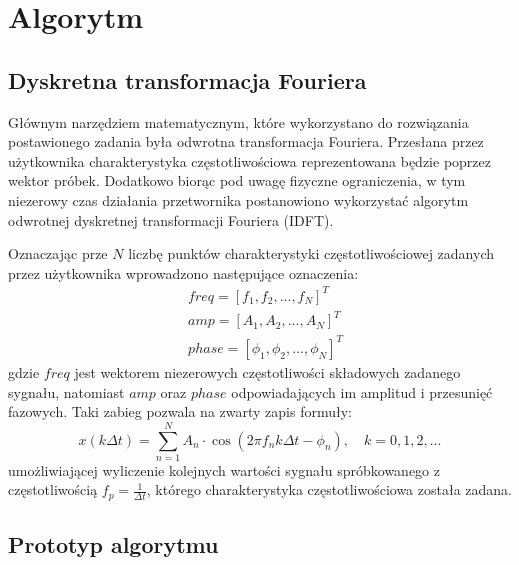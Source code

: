\section{Algorytm}
\subsection{Dyskretna transformacja Fouriera}
Głównym narzędziem matematycznym, które wykorzystano do rozwiązania postawionego zadania była odwrotna transformacja Fouriera. Przesłana przez użytkownika charakterystyka częstotliwościowa reprezentowana będzie poprzez wektor próbek. Dodatkowo biorąc pod uwagę fizyczne ograniczenia, w tym niezerowy czas działania przetwornika postanowiono wykorzystać algorytm odwrotnej dyskretnej transformacji Fouriera (IDFT). 

Oznaczając prze $N$ liczbę punktów charakterystyki częstotliwościowej zadanych przez użytkownika wprowadzono następujące oznaczenia:
\begin{align*} 
&freq = [f_1, f_2, ..., f_N]^T \\ 
&amp = [A_1, A_2, ..., A_N]^T \\
&phase = [\phi_1, \phi_2, ..., \phi_N]^T
\end{align*}
gdzie $freq$ jest wektorem niezerowych częstotliwości składowych zadanego sygnału, natomiast $amp$ oraz $phase$ odpowiadających im amplitud i przesunięć fazowych. Taki zabieg pozwala na zwarty zapis formuły:
\begin{equation}
x(k\Delta t) = \sum_{n=1}^{N}A_n\cdot\cos(2 \pi f_nk \Delta t - \phi_n), \quad k=0,1,2,...
\end{equation}
umożliwiającej wyliczenie kolejnych wartości sygnału spróbkowanego z częstotliwością $f_p=\frac{1}{\Delta t}$, którego charakterystyka częstotliwościowa została zadana.

\subsection{Prototyp algorytmu}


